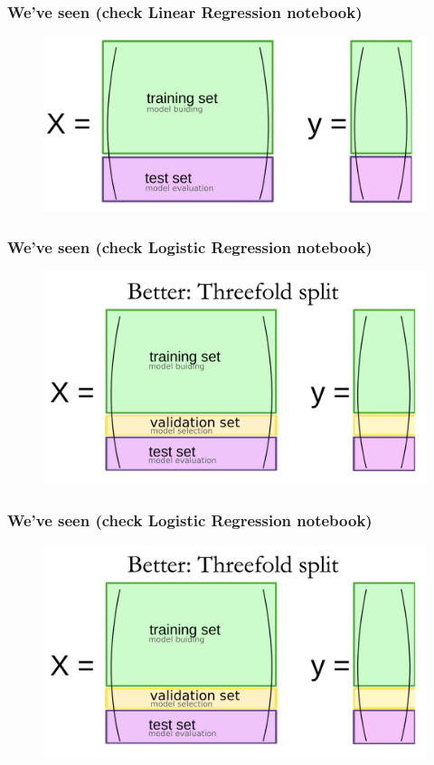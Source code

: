 \documentclass[compress, aspectratio=54]{beamer}
\begin{document}
\begin{frame}
\frametitle{We've seen (check Linear Regression notebook)}
\begin{figure}

\includegraphics[width=0.9\linewidth ]{Figures/train-test-split.png}
\end{figure}

\end{frame}


\begin{frame}
\frametitle{We've seen (check Logistic Regression notebook)}
\begin{figure}
\includegraphics[width=0.9\linewidth ]{Figures/threefold-split.png}
\end{figure}
\end{frame}

\begin{frame}
\frametitle{We've seen (check Logistic Regression notebook)}
\begin{figure}
\includegraphics[width=0.9\linewidth ]{Figures/threefold-split.png}
\end{figure}
\end{frame}
\end{document}
